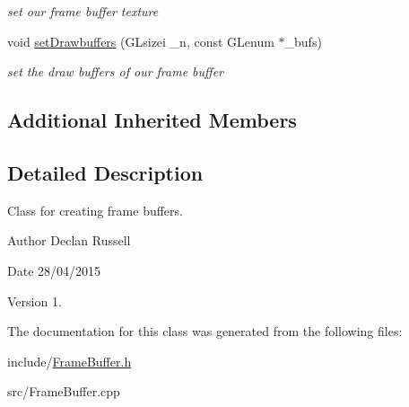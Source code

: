 \begin{DoxyCompactItemize}
\begin{DoxyCompactList}\small\item\em set our frame buffer texture \end{DoxyCompactList}\item 
\hypertarget{class_frame_buffer_a399edc3b7d856ead72e5e04d73223643}{void \hyperlink{class_frame_buffer_a399edc3b7d856ead72e5e04d73223643}{set\-Drawbuffers} (G\-Lsizei \-\_\-n, const G\-Lenum $\ast$\-\_\-bufs)}\label{class_frame_buffer_a399edc3b7d856ead72e5e04d73223643}

\begin{DoxyCompactList}\small\item\em set the draw buffers of our frame buffer \end{DoxyCompactList}\end{DoxyCompactItemize}
\subsection*{Additional Inherited Members}


\subsection{Detailed Description}
Class for creating frame buffers. 

\begin{DoxyAuthor}{Author}
Declan Russell 
\end{DoxyAuthor}
\begin{DoxyDate}{Date}
28/04/2015 
\end{DoxyDate}
\begin{DoxyVersion}{Version}
1. 
\end{DoxyVersion}


The documentation for this class was generated from the following files\-:\begin{DoxyCompactItemize}
\item 
include/\hyperlink{_frame_buffer_8h}{Frame\-Buffer.\-h}\item 
src/Frame\-Buffer.\-cpp\end{DoxyCompactItemize}
